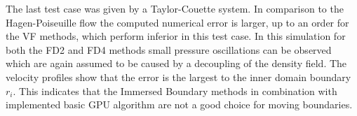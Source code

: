 The last test case was given by a Taylor-Couette system.
In comparison to the Hagen-Poiseuille flow the computed numerical error is larger,
up to an order for the VF methods, which perform inferior in this test case.
In this simulation for both the FD2 and FD4 methods small pressure oscillations can be observed which are again assumed to be
caused by a decoupling of the density field.
The velocity profiles show that the error is the largest to the inner domain boundary $r_i$.
This indicates that the Immersed Boundary methods in combination with implemented basic GPU algorithm
are not a good choice for moving boundaries.




